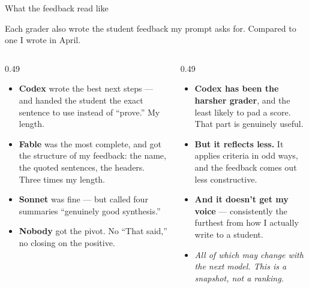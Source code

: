 \documentclass[aspectratio=169, 10pt]{beamer}
\begin{document}
\begin{frame}{What the feedback read like}
\vskip-6pt
{\footnotesize Each grader also wrote the student feedback my prompt asks for. Compared to one I wrote in April.\par}
\vskip3pt
\begin{columns}[T]
\begin{column}{0.49\textwidth}
\begin{tcolorbox}[keybox, title={\faTools\quad On this paper}, top=2pt, bottom=2pt]
\scriptsize
\begin{itemize}\setlength{\itemsep}{3pt}
  \item \textbf{Codex} wrote the best next steps --- and handed the student the exact sentence to use instead of ``prove.'' My length.
  \item \textbf{Fable} was the most complete, and got the structure of my feedback: the name, the quoted sentences, the headers. Three times my length.
  \item \textbf{Sonnet} was fine --- but called four summaries ``genuinely good synthesis.''
  \item \textbf{Nobody} got the pivot. No ``That said,'' no closing on the positive.
\end{itemize}
\end{tcolorbox}
\end{column}
\begin{column}{0.49\textwidth}
\begin{tcolorbox}[dontbox, title={\faExclamationTriangle\quad But across everything I've graded}, top=2pt, bottom=2pt]
\scriptsize
\begin{itemize}\setlength{\itemsep}{3pt}
  \item \textbf{Codex has been the harsher grader}, and the least likely to pad a score. That part is genuinely useful.
  \item \textbf{But it reflects less.} It applies criteria in odd ways, and the feedback comes out less constructive.
  \item \textbf{And it doesn't get my voice} --- consistently the furthest from how I actually write to a student.
  \item \emph{All of which may change with the next model. This is a snapshot, not a ranking.}
\end{itemize}
\end{tcolorbox}
\end{column}
\end{columns}

\end{frame}
\end{document}
